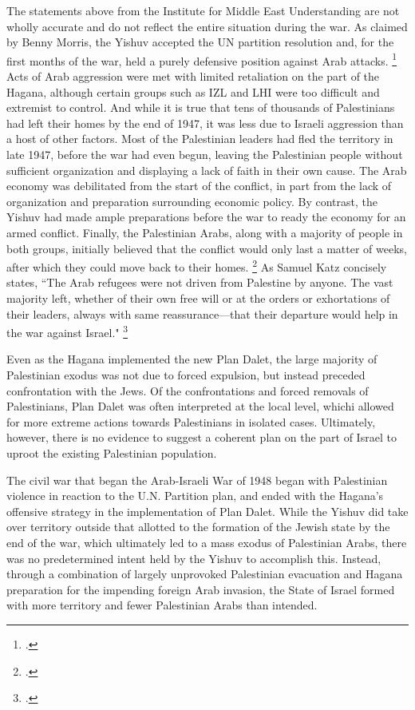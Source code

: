 \documentclass[12pt]{turabian-researchpaper}
\begin{document}
The statements above from the Institute for Middle East Understanding are not wholly accurate and do not reflect the entire situation during the war.  As claimed by Benny Morris, the Yishuv accepted the UN partition resolution and, for the first months of the war, held a purely defensive position against Arab attacks.
\footcite[][98-100]{morris}
Acts of Arab aggression were met with limited retaliation on the part of the Hagana, although certain groups such as IZL and LHI were too difficult and extremist to control.
And while it is true that tens of thousands of Palestinians had left their homes by the end of 1947, it was less due to Israeli aggression than a host of other factors.  Most of the Palestinian leaders had fled the territory in late 1947, before the war had even begun, leaving the Palestinian people without sufficient organization and displaying a lack of faith in their own cause.  The Arab economy was debilitated from the start of the conflict, in part from the lack of organization and preparation surrounding economic policy.  By contrast, the Yishuv had made ample preparations before the war to ready the economy for an armed conflict.  Finally, the Palestinian Arabs, along with a majority of people in both groups, initially believed that the conflict would only last a matter of weeks, after which they could move back to their homes.
\footcite[][84-85]{pappe}
As Samuel Katz concisely states, ``The Arab refugees were not driven from Palestine by anyone.  The vast majority left, whether of their own free will or at the orders or exhortations of their leaders, always with same reassurance—that their departure would help in the war against Israel."
\footcite[][64]{dajani}



Even as the Hagana implemented the new Plan Dalet, the large majority of Palestinian exodus was not due to forced expulsion, but instead preceded confrontation with the Jews.  Of the confrontations and forced removals of Palestinians, Plan Dalet was often interpreted at the local level, whichi allowed for more extreme actions towards Palestinians in isolated cases.  Ultimately, however, there is no evidence to suggest a coherent plan on the part of Israel to uproot the existing Palestinian population.



The civil war that began the Arab-Israeli War of 1948 began with Palestinian violence in reaction to the U.N. Partition plan, and ended with the Hagana's offensive strategy in the implementation of Plan Dalet.  While the Yishuv did take over territory outside that allotted to the formation of the Jewish state by the end of the war, which ultimately led to a mass exodus of Palestinian Arabs, there was no predetermined intent held by the Yishuv to accomplish this.  Instead, through a combination of largely unprovoked Palestinian evacuation and Hagana preparation for the impending foreign Arab invasion, the State of Israel formed with more territory and fewer Palestinian Arabs than intended.
\end{document}
